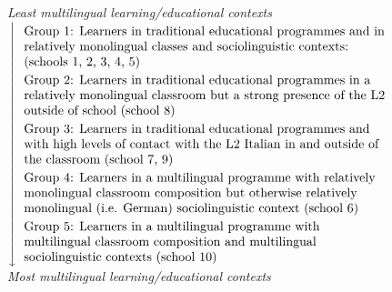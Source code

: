 \documentclass[varwidth]{standalone}
\begin{document}
	\textit{Least multilingual learning/educational contexts}\\
	$
	\left\downarrow {\def\arraystretch{1.2}\begin{tabular}{>{\raggedright\arraybackslash}p{10cm}}
			Group 1: Learners in traditional educational programmes and in relatively monolingual classes and sociolinguistic contexts: (schools 1, 2, 3, 4, 5) \\
			Group 2: Learners in traditional educational programmes in a relatively monolingual classroom but a strong presence of the L2 outside of school (school 8) \\
			Group 3: Learners in traditional educational programmes and with high levels of contact with the L2 Italian in and outside of the classroom (school 7, 9) \\
			Group 4: Learners in a multilingual programme with relatively monolingual classroom composition but otherwise relatively monolingual (i.e. German) sociolinguistic context (school 6) \\
			Group 5: Learners in a multilingual programme with multilingual classroom composition and multilingual sociolinguistic contexts (school 10) \\
	\end{tabular}}\right.
	$\\
	\textit{Most multilingual learning/educational contexts}
\end{document}
